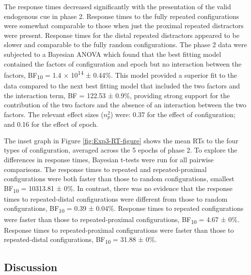 \documentclass[
  man,floatsintext]{apa7}
\begin{document}
The response times decreased significantly with the presentation of the valid endogenous cue in phase 2. Response times to the fully repeated configurations were somewhat comparable to those when just the proximal repeated distractors were present. Response times for the distal repeated distractors appeared to be slower and comparable to the fully random configurations. The phase 2 data were subjected to a Bayesian ANOVA which found that the best fitting model contained the factors of configuration and epoch but no interaction between the factors, BF\textsubscript{10} = 1.4 × 10\textsuperscript{14} ± 0.44\%. This model provided a superior fit to the data compared to the next best fitting model that included the two factors and the interaction term, BF = 122.53 ± 0.9\%, providing strong support for the contribution of the two factors and the absence of an interaction between the two factors. The relevant effect sizes (\(n^2_p\)) were: 0.37 for the effect of configuration; and 0.16 for the effect of epoch.

The inset graph in Figure \ref{fig:Exp3-RT-figure} shows the mean RTs to the four types of configuration, averaged across the 5 epochs of phase 2. To explore the differences in response times, Bayesian t-tests were run for all pairwise comparisons. The response times to repeated and repeated-proximal configurations were both faster than those to random configurations, smallest BF\textsubscript{10} = 10313.81 ± 0\%. In contrast, there was no evidence that the response times to repeated-distal configurations were different from those to random configurations, BF\textsubscript{10} = 0.39 ± 0.04\%. Response times to repeated configurations were faster than those to repeated-proximal configurations, BF\textsubscript{10} = 4.67 ± 0\%. Response times to repeated-proximal configurations were faster than those to repeated-distal configurations, BF\textsubscript{10} = 31.88 ± 0\%.

\hypertarget{discussion-2}{%
\subsection{Discussion}\label{discussion-2}}
\end{document}
